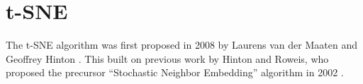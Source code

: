 \chapter{t-SNE}\label{chapter:t-sne}

The t-SNE algorithm was first proposed in 2008 by Laurens van der Maaten and Geoffrey Hinton \cite{vdMaa08}. 
This built on previous work by Hinton and Roweis, who proposed the precursor \enquote{Stochastic Neighbor Embedding} algorithm in 2002 \cite{Hinton02}. 



